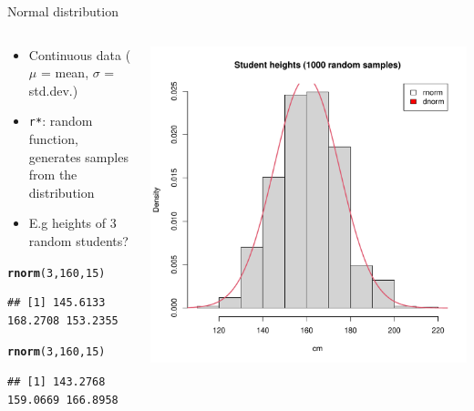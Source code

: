 \documentclass[aspectratio=169]{beamer}\usepackage[]{graphicx}\usepackage[]{color}
\makeatletter
\def\maxwidth{ %
  \ifdim\Gin@nat@width>\linewidth
    \linewidth
  \else
    \Gin@nat@width
  \fi
}
\newcommand{\hlnum}[1]{\textcolor[rgb]{0.686,0.059,0.569}{#1}}%
\newcommand{\hlstd}[1]{\textcolor[rgb]{0.345,0.345,0.345}{#1}}%
\newcommand{\hlkwd}[1]{\textcolor[rgb]{0.737,0.353,0.396}{\textbf{#1}}}%
\newenvironment{kframe}{%
 \def\at@end@of@kframe{}%
 \ifinner\ifhmode%
  \def\at@end@of@kframe{\end{minipage}}%
  \begin{minipage}{\columnwidth}%
 \fi\fi%
 \def\FrameCommand##1{\hskip\@totalleftmargin \hskip-\fboxsep
 \colorbox{shadecolor}{##1}\hskip-\fboxsep
     \hskip-\linewidth \hskip-\@totalleftmargin \hskip\columnwidth}%
 \MakeFramed {\advance\hsize-\width
   \@totalleftmargin\z@ \linewidth\hsize
   \@setminipage}}%
 {\par\unskip\endMakeFramed%
 \at@end@of@kframe}
\newenvironment{knitrout}{}{} %
\makeatother
\begin{document}
\begin{frame}[fragile]{Normal distribution}
\begin{columns}
  \begin{column}{0.5\textwidth}
  \begin{itemize}
    \item Continuous data ($\mu$ = mean, $\sigma$ = std.dev.)
    \item \texttt{r*}: random function, generates samples from the distribution
    \item E.g heights of 3 random students?
  \end{itemize}
\begin{knitrout}\scriptsize
{}\color{fgcolor}\begin{kframe}
\begin{alltt}
\hlkwd{rnorm}\hlstd{(}\hlnum{3}\hlstd{,} \hlnum{160}\hlstd{,} \hlnum{15}\hlstd{)}
\end{alltt}
\begin{verbatim}
## [1] 145.6133 168.2708 153.2355
\end{verbatim}
\begin{alltt}
\hlkwd{rnorm}\hlstd{(}\hlnum{3}\hlstd{,} \hlnum{160}\hlstd{,} \hlnum{15}\hlstd{)}
\end{alltt}
\begin{verbatim}
## [1] 143.2768 159.0669 166.8958
\end{verbatim}
\end{kframe}
\end{knitrout}
  \end{column}
  \begin{column}{0.5\textwidth}
\begin{knitrout}\scriptsize
{}\color{fgcolor}
\includegraphics[width=\maxwidth]{figure/unnamed-chunk-18-1} 


\end{knitrout}
\end{column}
\end{columns}
\end{frame}
\end{document}

